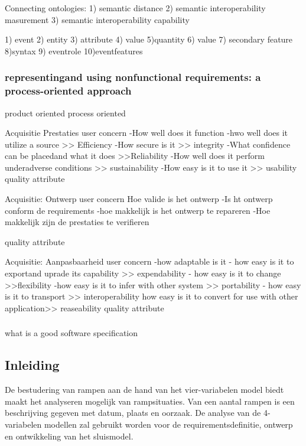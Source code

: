 Connecting ontologies:
1) semantic distance
2) semantic interoperability masurement
3) semantic interoperability capability

1) event
2) entity
3) attribute
4) value
5)quantity
6) value
7) secondary feature
8)syntax
9) eventrole
10)eventfeatures




\subsubsection{representingand using nonfunctional requirements: a process-oriented approach}
product oriented
process oriented


Acquisitie Prestaties
user concern
-How well does it function
-hwo well does it utilize a source >> Efficiency
-How secure is it >> integrity
-What confidence can be placedand what it does >>Reliability
-How well does it perform underadverse conditions >> sustainability
-How easy is it to use it >> usability
quality attribute


Acquisitie: Ontwerp
user concern
Hoe valide is het ontwerp
-Is ht ontwerp conform de requirements
-hoe makkelijk is het ontwerp te repareren
-Hoe makkelijk zijn de prestaties te verifieren

quality attribute


Acquisitie: Aanpasbaarheid
user concern
-how adaptable is it
- how easy is it to exportand uprade its capability >> expendability
- how easy is it to change >>flexibility
-how easy is it to infer with other system >> portability
- how easy is it to transport >> interoperability
how easy is it to convert for use with other application>> reaseability
quality attribute
\subsubsection{}

what is a good software specification

\cite{fvaandrager2322010Goodmodel}
\cite{onix01102022devopmodel}
\cite{sulemani04012021softwareprocesmodel}
\cite{globalluxsoft18102017softdev}
\cite{wiegers30052022SRS}
\cite{muller06092020goodspecification}
\cite{informit30062008reqmanagement}
\cite{altexsoft15092020writingSRS}
\cite{bibid}

 


\subsection{Inleiding}
De bestudering van rampen aan de hand van het vier-variabelen model biedt maakt het analyseren mogelijk van rampsituaties. Van een aantal rampen is een beschrijving gegeven met datum, plaats en oorzaak. De analyse van de 4-variabelen modellen zal gebruikt worden voor de requirementsdefinitie, ontwerp en ontwikkeling van het sluismodel. 
